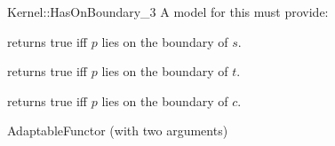 \begin{ccRefFunctionObjectConcept}{Kernel::HasOnBoundary_3}
A model for this must provide:


{returns true iff $p$ lies on the boundary of $s$.}

{returns true iff $p$ lies on the boundary of $t$.}

{returns true iff $p$ lies on the boundary of $c$.}

\ccRefines
AdaptableFunctor (with two arguments)

\ccSeeAlso
{} \\
 \\
 \\

\end{ccRefFunctionObjectConcept}
